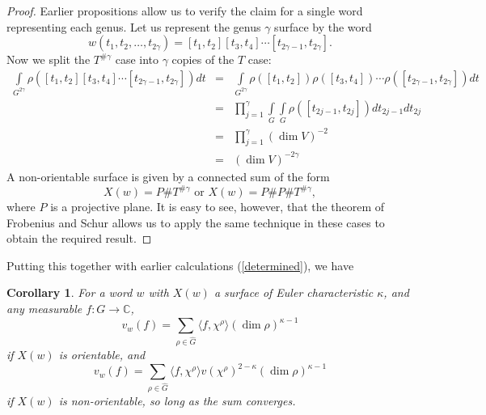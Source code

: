 \documentclass[12pt]{article}
\newtheorem{cor}[thm]{Corollary}
\newcommand{\C}{\mathbb{C}}
\newcommand{\be}{\begin{equation}}
\newcommand{\ee}{\end{equation}}
\newcommand{\bea}{\begin{eqnarray}}
\newcommand{\eea}{\end{eqnarray}}
\begin{document}
\begin{proof}
Earlier propositions allow us to verify the claim for a single word representing each genus.  Let us represent the genus $\gamma$ surface by the word
\be w(t_1, t_2, \ldots, t_{2\gamma}) = [t_1,t_2][t_3,t_4] \cdots [t_{2\gamma-1},t_{2\gamma}]. \ee
Now we split the $T^{\# \gamma}$ case into $\gamma$ copies of the $T$ case:
\bea 
\int \limits_{G^{2\gamma}} \rho([t_1,t_2][t_3,t_4] \cdots [t_{2\gamma-1},t_{2\gamma}]) dt & = & \int \limits_{G^{2\gamma}} \rho([t_1,t_2])\rho([t_3,t_4]) \cdots \rho([t_{2\gamma-1},t_{2\gamma}]) dt \\
& = & \prod_{j=1}^{\gamma} \int \limits_{G} \int \limits_{G} \rho([t_{2j-1},t_{2j}]) dt_{2j-1} dt_{2j}\\
& = & \prod_{j=1}^{\gamma} (\dim V)^{-2} \\
& = & (\dim V)^{-2\gamma}
\eea
A non-orientable surface is given by a connected sum of the form
\be X(w) = P \# T^{\# \gamma} \mbox{           or           } X(w) = P \# P \# T^{\# \gamma}, \ee
where $P$ is a projective plane.  It is easy to see, however, that the theorem of Frobenius and Schur allows us to apply the same technique in these cases to obtain the required result.
\end{proof}

Putting this together with earlier calculations (\ref{determined}), we have
\begin{cor}\label{functional}
For a word $w$ with $X(w)$ a surface of Euler characteristic $\kappa$, and any measurable $f: G \to \C$,
\be 
v_w(f) = \sum_{\rho \in \hat{G}} \langle f, \chi^\rho \rangle (\dim \rho)^{\kappa - 1}
\ee
if $X(w)$ is orientable, and 
\be 
v_w(f) = \sum_{\rho \in \hat{G}} \langle f, \chi^\rho \rangle v(\chi^\rho)^{2 - \kappa} (\dim \rho)^{\kappa - 1}
\ee
if $X(w)$ is non-orientable, so long as the sum converges.
\end{cor}
\end{document}
